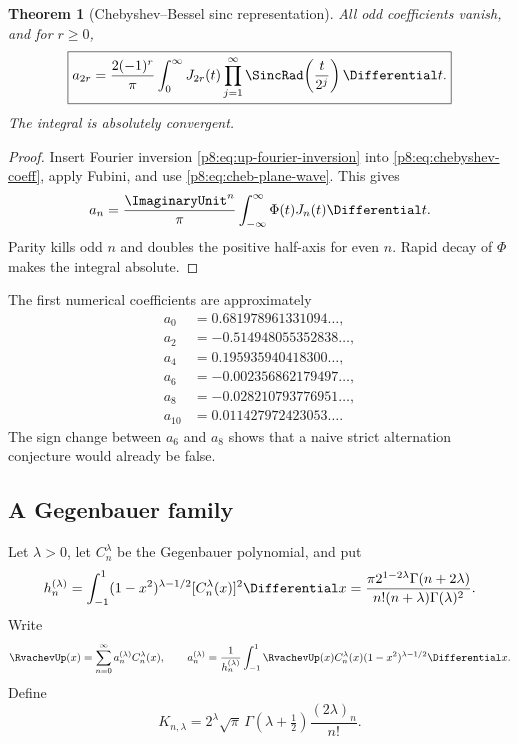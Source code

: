 \documentclass[11pt]{article}
\newtheorem{theorem}{Theorem}[section]
\theoremstyle{definition}
\theoremstyle{remark}
\begin{document}
\begin{theorem}[Chebyshev--Bessel sinc representation]
\label{p8:thm:cheb-bessel}
All odd coefficients vanish, and for $r\ge0$,
\begin{equation}
 \boxed{\displaystyle
 a_{2r}=\frac{2(-1)^r}{\pi}
 \int_0^\infty J_{2r}(t)
 \prod_{j=1}^\infty\SincRad\!\left(\frac{t}{2^j}\right)\Differential t.} \label{p8:eq:cheb-bessel}
\end{equation}
The integral is absolutely convergent.
\end{theorem}

\begin{proof}
Insert Fourier inversion \eqref{p8:eq:up-fourier-inversion} into
\eqref{p8:eq:chebyshev-coeff}, apply Fubini, and use
\eqref{p8:eq:cheb-plane-wave}.  This gives
\[
 a_n=\frac{\ImaginaryUnit^n}{\pi}\int_{-\infty}^{\infty}\Phi(t)J_n(t)\Differential t.
\]
Parity kills odd $n$ and doubles the positive half-axis for even $n$.
Rapid decay of $\Phi$ makes the integral absolute.
\end{proof}

The first numerical coefficients are approximately
\begin{equation}
 \begin{split}
 a_0&= 0.681978961331094\ldots,\\
 a_2&=-0.514948055352838\ldots,\\
 a_4&= 0.195935940418300\ldots,\\
 a_6&=-0.002356862179497\ldots,\\
 a_8&=-0.028210793776951\ldots,\\
 a_{10}&=0.011427972423053\ldots.
 \end{split}                                             \label{p8:eq:cheb-first}
\end{equation}
The sign change between $a_6$ and $a_8$ shows that a naive strict alternation
conjecture would already be false.

\subsection{A Gegenbauer family}

Let $\lambda>0$, let $C_n^\lambda$ be the Gegenbauer polynomial, and put
\begin{equation}
 h_n^{(\lambda)}=
 \int_{-1}^{1}(1-x^2)^{\lambda-1/2}
 [C_n^\lambda(x)]^2\Differential x
 =\frac{\pi2^{1-2\lambda}\Gamma(n+2\lambda)}
 {n!(n+\lambda)\Gamma(\lambda)^2}.                       \label{p8:eq:gegenbauer-norm}
\end{equation}
Write
\begin{equation}
 \RvachevUp(x)=\sum_{n=0}^\infty a_n^{(\lambda)}C_n^\lambda(x),
 \qquad
 a_n^{(\lambda)}=\frac1{h_n^{(\lambda)}}
 \int_{-1}^{1}\RvachevUp(x)C_n^\lambda(x)
 (1-x^2)^{\lambda-1/2}\Differential x.                            \label{p8:eq:gegenbauer-series}
\end{equation}
Define
\begin{equation}
 K_{n,\lambda}=2^\lambda\sqrt\pi\,
 \Gamma(\lambda+\tfrac12)\frac{(2\lambda)_n}{n!}.      \label{p8:eq:gegenbauer-K}
\end{equation}
\end{document}
